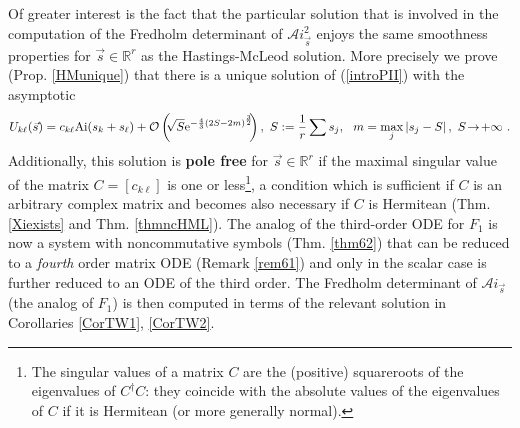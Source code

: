 \documentclass{article}
\def\R{{\mathbb R}}
\def\Ai{\mathrm{Ai}}
\def\Ai{\mathrm{Ai}}
\newcommand{\be}{\begin{eqnarray}}
\newcommand{\ee}{\end{eqnarray}}
\def\le{\left}
\def\ri{\right}
\begin{document}
Of greater interest is the fact that the particular solution that is involved in the computation of the Fredholm determinant of $\mathcal Ai_{\vec s}^2$ enjoys the same smoothness properties for $\vec s\in \R^r$ as the Hastings-McLeod solution. More precisely we prove (Prop. \ref{HMunique}) that there is a unique solution of (\ref{introPII}) with the asymptotic
\be
U_{k\ell}(\vec s) = c_{k\ell} \Ai(s_k + s_\ell) + \mathcal O\le (\!\! \sqrt {S} {\rm e}^{-\frac 43 (2S-2m)^\frac 32}\!\!\ri) ,  \ S:=\frac 1r \sum s_j ,\ \ m=\max_j |s_j-S|\, , \ S\!\to\! +\infty\nonumber \ .
\ee
Additionally, this solution is {\bf pole free} for $\vec s\in \R^r$ if the maximal singular value of the matrix $C=[c_{k\ell}]$ is one or less\footnote{The singular values of a matrix $C$ are the (positive) squareroots of the eigenvalues of $C^\dagger C$: they coincide with the absolute values of the eigenvalues of $C$ if it is Hermitean (or more generally normal).}, a condition which is sufficient if $C$ is an arbitrary complex matrix and becomes also necessary if $C$ is Hermitean (Thm. \ref{Xiexists} and Thm. \ref{thmncHML}).
The analog of the third-order ODE for $F_1$ is now a system with noncommutative symbols (Thm. \ref{thm62}) that can be reduced to a {\em fourth} order matrix ODE (Remark \ref{rem61}) and only in the scalar case is further reduced to an ODE of the third order. The Fredholm determinant of $\mathcal Ai_{\vec s}$ (the analog of $F_1$) is then computed in terms of the relevant solution in Corollaries \ref{CorTW1}, \ref{CorTW2}. 
\end{document}
